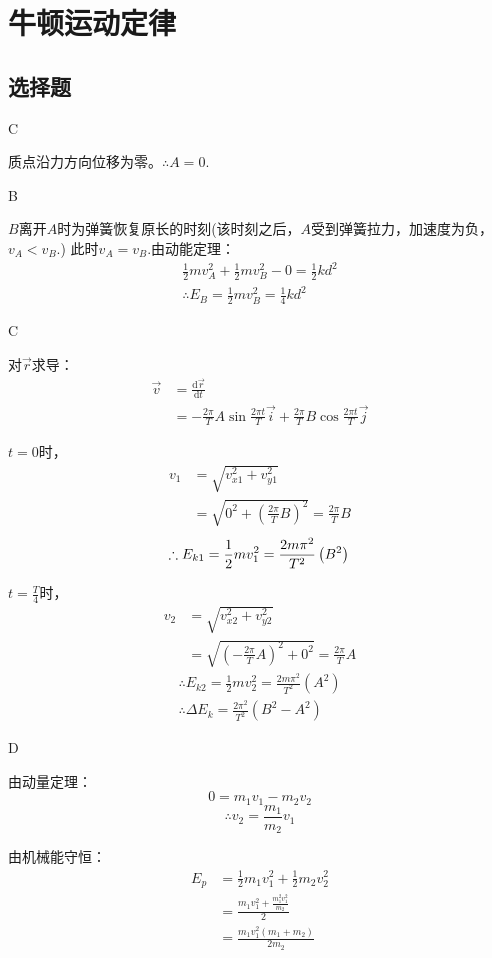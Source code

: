 \documentclass[b5paper,opensource]{qyxf-book}
\newcommand{\di}[1]{\mathrm{d}#1}
\begin{document}
\chapter{牛顿运动定律}
\section{选择题}

C

质点沿力方向位移为零。$\therefore A=0$.

B

$B$离开$A$时为弹簧恢复原长的时刻(该时刻之后，$A$受到弹簧拉力，加速度为负，$v_A<v_B$.)
此时$v_A=v_B$.由动能定理：
\begin{align*}
\frac{1}{2}mv_A^2+\frac{1}{2}mv_B^2-0=\frac{1}{2}kd^2\\
\therefore{}E_B=\frac{1}{2}mv_B^2=\frac{1}{4}kd^2
\end{align*}

C

对$\vec{r}$求导：
\begin{align*}
\vec{v}&=\frac{\di{\vec{r}}}{\di{t}}\\
&=-\frac{2\pi}{T}A\sin\frac{2\pi t}{T}\vec{i}+\frac{2\pi}{T}B\cos\frac{2\pi t}{T}\vec{j}
\end{align*}
\par$t=0$时，
\begin{align*}
v_1&=\sqrt{v_{x1}^2+v_{y1}^2}\\
&=\sqrt{0^2+\left(\frac{2\pi}{T}B\right)^2}=\frac{2\pi}{T}B
\end{align*}
\[\therefore{}E_{k1}=\frac{1}{2}mv_1^2=\frac{2m\pi^2}{T^2}\left(B^2\right)\\\]
\par$t=\frac{T}{4}$时，
\begin{align*}
v_2&=\sqrt{v_{x2}^2+v_{y2}^2}\\
&=\sqrt{\left(-\frac{2\pi}{T}A\right)^2+0^2}=\frac{2\pi}{T}A
\end{align*}
\begin{gather*}
\therefore{}E_{k2}=\frac{1}{2}mv_2^2=\frac{2m\pi^2}{T^2}\left(A^2\right)\\
\therefore\Delta{}E_k=\frac{2\pi^2}{T^2}(B^2-A^2)
\end{gather*}

D

由动量定理：
\[0=m_1v_1-m_2v_2\]
\[\therefore{}v_2=\frac{m_1}{m_2}v_1\]

由机械能守恒：
\begin{align*}
E_p &=\frac{1}{2}m_1v_1^2+\frac{1}{2}m_2v_2^2\\
&=\frac{m_1v_1^2+\frac{m_1^2v_1^2}{m_2}}{2}\\
&=\frac{m_1v_1^2\left(m_1+m_2\right)}{2m_2}
\end{align*}
\end{document}

